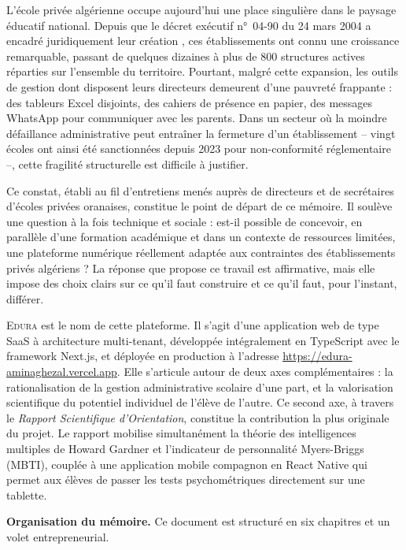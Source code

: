 \documentclass[12pt,a4paper,oneside]{report}
\newcommand{\edura}{\textsc{Edura}}
\begin{document}
L'école privée algérienne occupe aujourd'hui une place singulière dans le paysage éducatif national. Depuis que le décret exécutif n°~04-90 du 24 mars 2004 a encadré juridiquement leur création \autocite{decret2004}, ces établissements ont connu une croissance remarquable, passant de quelques dizaines à plus de 800 structures actives réparties sur l'ensemble du territoire. Pourtant, malgré cette expansion, les outils de gestion dont disposent leurs directeurs demeurent d'une pauvreté frappante : des tableurs Excel disjoints, des cahiers de présence en papier, des messages WhatsApp pour communiquer avec les parents. Dans un secteur où la moindre défaillance administrative peut entraîner la fermeture d'un établissement -- vingt écoles ont ainsi été sanctionnées depuis 2023 pour non-conformité réglementaire --, cette fragilité structurelle est difficile à justifier.

Ce constat, établi au fil d'entretiens menés auprès de directeurs et de secrétaires d'écoles privées oranaises, constitue le point de départ de ce mémoire. Il soulève une question à la fois technique et sociale : est-il possible de concevoir, en parallèle d'une formation académique et dans un contexte de ressources limitées, une plateforme numérique réellement adaptée aux contraintes des établissements privés algériens ? La réponse que propose ce travail est affirmative, mais elle impose des choix clairs sur ce qu'il faut construire et ce qu'il faut, pour l'instant, différer.

\edura{} est le nom de cette plateforme. Il s'agit d'une application web de type SaaS à architecture multi-tenant, développée intégralement en TypeScript avec le framework Next.js, et déployée en production à l'adresse \url{https://edura-aminaghezal.vercel.app}. Elle s'articule autour de deux axes complémentaires : la rationalisation de la gestion administrative scolaire d'une part, et la valorisation scientifique du potentiel individuel de l'élève de l'autre. Ce second axe, à travers le \textit{Rapport Scientifique d'Orientation}, constitue la contribution la plus originale du projet. Le rapport mobilise simultanément la théorie des intelligences multiples de Howard Gardner et l'indicateur de personnalité Myers-Briggs (\ac{MBTI}), couplée à une application mobile compagnon en React Native qui permet aux élèves de passer les tests psychométriques directement sur une tablette.

\vspace{6pt}
\noindent\textbf{Organisation du mémoire.} Ce document est structuré en six chapitres et un volet entrepreneurial.
\end{document}
